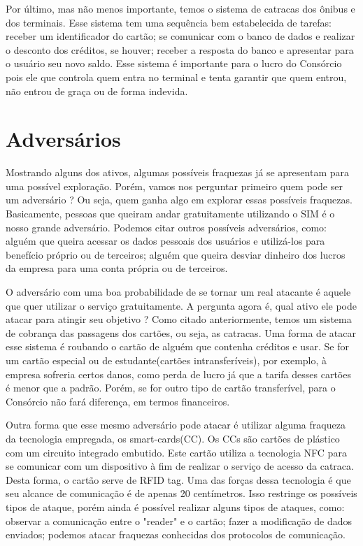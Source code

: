 \documentclass[openany]{ufsctex/ufsctex}
\begin{document}
	
	Por último, mas não menos importante, temos o sistema de catracas dos ônibus e dos terminais. Esse sistema tem uma sequência bem estabelecida de tarefas: receber um identificador do cartão; se comunicar com o banco de dados e realizar o desconto dos créditos, se houver; receber a resposta do banco e apresentar para o usuário seu novo saldo. Esse sistema é importante para o lucro do Consórcio pois ele que controla quem entra no terminal e tenta garantir que quem entrou, não entrou de graça ou de forma indevida.

   \chapter{Adversários}
  
 	Mostrando alguns dos ativos, algumas possíveis fraquezas já se apresentam para uma possível exploração. Porém, vamos nos perguntar primeiro quem pode ser um adversário ? Ou seja, quem ganha algo em explorar essas possíveis fraquezas. Basicamente, pessoas que queiram andar gratuitamente utilizando o SIM é o nosso grande adversário. Podemos citar outros possíveis adversários, como: alguém que queira acessar os dados pessoais dos usuários e utilizá-los para benefício próprio ou de terceiros; alguém que queira desviar dinheiro dos lucros da empresa para uma conta própria ou de terceiros.
 
 
	 O adversário com uma boa probabilidade de se tornar um real atacante é aquele que quer utilizar o serviço gratuitamente. A pergunta agora é, qual ativo ele pode atacar para atingir seu objetivo ? Como citado anteriormente, temos um sistema de cobrança das passagens dos cartões, ou seja, as catracas. Uma forma de atacar esse sistema é roubando o cartão de alguém que contenha créditos e usar. Se for um cartão especial ou de estudante(cartões intransferíveis), por exemplo, à empresa sofreria certos danos, como perda de lucro já que a tarifa desses cartões é menor que a padrão. Porém, se for outro tipo de cartão transferível, para o Consórcio não fará diferença, em termos financeiros.
	
	
	 Outra forma que esse mesmo adversário pode atacar é utilizar alguma fraqueza da tecnologia empregada, os smart-cards(CC). Os CCs são cartões de plástico com um circuito integrado embutido. Este cartão utiliza a tecnologia NFC para se comunicar com um dispositivo à fim de realizar o serviço de acesso da catraca. Desta forma, o cartão serve de RFID tag. Uma das forças dessa tecnologia é que seu alcance de comunicação é de apenas 20 centímetros. Isso restringe os possíveis tipos de ataque, porém ainda é possível realizar alguns tipos de ataques, como: observar a comunicação entre o "reader" e o cartão; fazer a modificação de dados enviados; podemos atacar fraquezas conhecidas dos protocolos de comunicação.
\end{document}
